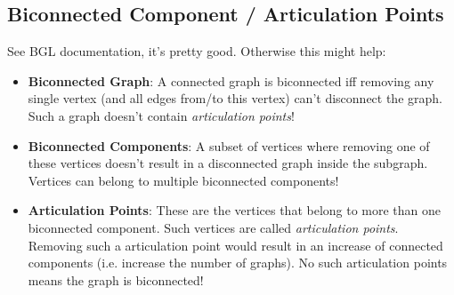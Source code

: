 \documentclass[a4paper,titlepage]{article}
\begin{document}
\subsection{Biconnected Component / Articulation Points}
See BGL documentation, it's pretty good. Otherwise this might help:
\begin{itemize}
\item \textbf{Biconnected Graph}: A connected graph is biconnected iff removing any single vertex (and all edges from/to this vertex) can't disconnect the graph. Such a graph doesn't contain \textit{articulation points}!
\item \textbf{Biconnected Components}: A subset of vertices where removing one of these vertices doesn't result in a disconnected graph inside the subgraph. Vertices can belong to multiple biconnected components!
\item \textbf{Articulation Points}: These are the vertices that belong to more than one biconnected component. Such vertices are called \textit{articulation points}. Removing such a articulation point would result in an increase of connected components (i.e. increase the number of graphs). No such articulation points means the graph is biconnected!
\end{itemize}

\newpage
\printindex
\end{document}
